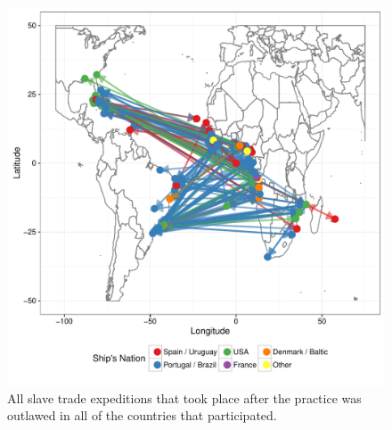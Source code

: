 \documentclass[DIV=calc, paper=a4, fontsize=10pt, twocolumn]{scrartcl}\usepackage[]{graphicx}\usepackage[]{color}
\makeatletter
\def\maxwidth{ %
  \ifdim\Gin@nat@width>\linewidth
    \linewidth
  \else
    \Gin@nat@width
  \fi
}
\newenvironment{knitrout}{}{} %
\makeatother
\begin{document}
\begin{knitrout}
\color{fgcolor}\begin{figure}[h]
\includegraphics[width=\maxwidth]{figure/postban-1} \caption[All slave trade expeditions that took place after the practice was outlawed in all of the countries that participated]{All slave trade expeditions that took place after the practice was outlawed in all of the countries that participated.}\label{fig:postban}
\end{figure}


\end{knitrout}
\end{document}
